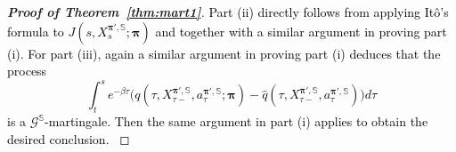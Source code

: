 \documentclass[11pt]{article}
\newcommand{\1}{\mathbbm{1}}
\newcommand{\bpi}{\boldsymbol{\pi}}
\newcommand{\rev}[1]{\textcolor{black}{{#1}}} %
\begin{document}
\begin{proof}[\bf Proof of Theorem~\ref{thm:mart1}]
\rev{ Part (ii) directly follows from applying It\^{o}'s formula to $J(s,  X_{s}^{\boldsymbol{\pi'}, \mathbb{S}}; \boldsymbol{\pi})$ and together with a similar argument  in proving part (i).
For part (iii), again a similar argument in proving part (i) deduces  that
the process
\begin{equation}
\int_t^s e^{-\beta \tau}   \big(   q(\tau,  X_{\tau-}^{\boldsymbol{\pi'}, \mathbb{S}}, a_\tau^{\boldsymbol{\pi'}, \mathbb{S}}; \boldsymbol{\pi}) -  \hat  q(\tau,  X_{\tau-}^{\boldsymbol{\pi'}, \mathbb{S}}, a_\tau^{\boldsymbol{\pi'}, \mathbb{S}}) \big)  d\tau	
\end{equation}
is a $\mathcal{G}^{\mathbb{S}}$-martingale. Then the same argument in part (i) applies to obtain the desired conclusion.
}
\end{proof}


\end{document}
